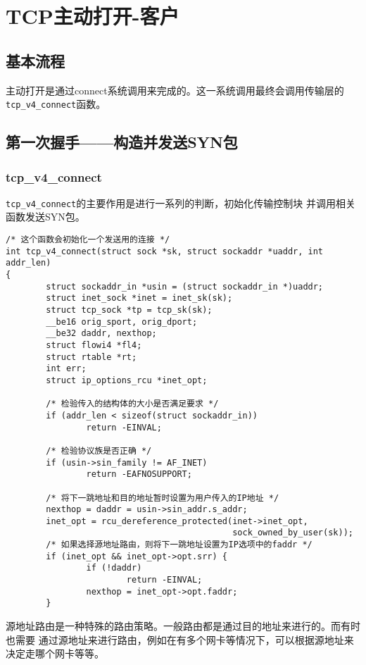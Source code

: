 \section{TCP主动打开-客户}
\label{sec:tcp_connect_client}

\subsection{基本流程}
\label{subsec:tcp_connect_flow}
主动打开是通过connect系统调用来完成的。这一系统调用最终会调用传输层的\texttt{tcp_v4_connect}函数。
\subsection{第一次握手——构造并发送SYN包}
\label{subsec:tcp_connect_syn}

\subsubsection{tcp\_v4\_connect}
\label{subsubsec:tcp_v4_connect}

\texttt{tcp_v4_connect}的主要作用是进行一系列的判断，初始化传输控制块
并调用相关函数发送SYN包。
\begin{verbatim}
/* 这个函数会初始化一个发送用的连接 */
int tcp_v4_connect(struct sock *sk, struct sockaddr *uaddr, int addr_len)
{
        struct sockaddr_in *usin = (struct sockaddr_in *)uaddr;
        struct inet_sock *inet = inet_sk(sk);
        struct tcp_sock *tp = tcp_sk(sk);
        __be16 orig_sport, orig_dport;
        __be32 daddr, nexthop;
        struct flowi4 *fl4;
        struct rtable *rt;
        int err;
        struct ip_options_rcu *inet_opt;

        /* 检验传入的结构体的大小是否满足要求 */
        if (addr_len < sizeof(struct sockaddr_in))
                return -EINVAL;

        /* 检验协议族是否正确 */
        if (usin->sin_family != AF_INET)
                return -EAFNOSUPPORT;

        /* 将下一跳地址和目的地址暂时设置为用户传入的IP地址 */
        nexthop = daddr = usin->sin_addr.s_addr;
        inet_opt = rcu_dereference_protected(inet->inet_opt,
                                             sock_owned_by_user(sk));
        /* 如果选择源地址路由，则将下一跳地址设置为IP选项中的faddr */
        if (inet_opt && inet_opt->opt.srr) {
                if (!daddr)
                        return -EINVAL;
                nexthop = inet_opt->opt.faddr;
        }
\end{verbatim}
源地址路由是一种特殊的路由策略。一般路由都是通过目的地址来进行的。而有时也需要
通过源地址来进行路由，例如在有多个网卡等情况下，可以根据源地址来决定走哪个网卡等等。

